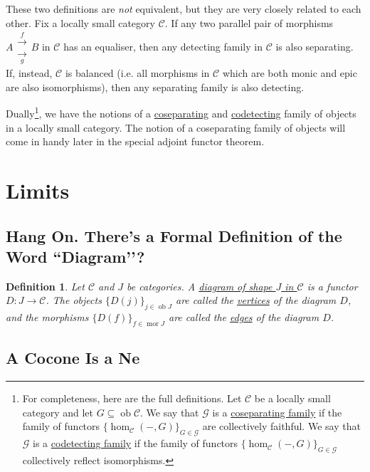 \documentclass[a4paper,11pt]{article}
\theoremstyle{break_italics}
\newtheorem*{definition*}{Definition}
\theoremstyle{break_upright}
\theoremstyle{remark}
\newcommand{\ob}{\operatorname{ob}}
\newcommand{\mor}{\operatorname{mor}}
\newcommand{\C}{\mathcal{C}}
\begin{document}
These two definitions are \textit{not} equivalent, but they are very closely related to each other. Fix a locally small category $\C$. If any two parallel pair of morphisms $A \substack{\xrightarrow{f} \\ \xrightarrow[g]{}} B$ in $\C$ has an equaliser, then any detecting family in $\C$ is also separating. If, instead, $\C$ is balanced (i.e. all morphisms in $\C$ which are both monic and epic are also isomorphisms), then any separating family is also detecting.

Dually\footnote{For completeness, here are the full definitions. Let $\C$ be a locally small category and let $G \subseteq \ob\C$. We say that $\mathcal G$ is a \uline{coseparating family} if the family of functors $\{\hom_\C(-,G)\}_{G \in \mathcal G}$ are collectively faithful. We say that $\mathcal G$ is a \uline{codetecting family} if the family of functors $\{\hom_\C(-,G)\}_{G \in \mathcal G}$ collectively reflect isomorphisms.}, we have the notions of a \uline{coseparating} and \uline{codetecting} family of objects in a locally small category. The notion of a coseparating family of objects will come in handy later in the special adjoint functor theorem.









\clearpage \newpage
\section{Limits}

\subsection{Hang On. There’s a Formal Definition of the Word ``Diagram’’?}

\begin{definition*}
	Let $\C$ and $J$ be categories. A \uline{diagram of shape $J$ in $\C$} is a functor $D \colon J \to \C$. The objects $\{D(j)\}_{j \in \ob J}$ are called the \uline{vertices} of the diagram $D$, and the morphisms $\{D(f)\}_{f \in \mor J}$ are called the \uline{edges} of the diagram $D$.	
\end{definition*}





\subsection{A Cocone Is a Ne}
\end{document}
